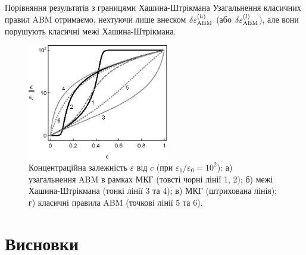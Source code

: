 \documentclass[10pt]{beamer}
\begin{document}
\begin{frame}{Порівняння результатів з границями Хашина-Штрікмана}
\footnotesize
Узагальнення класичних правил ABM отримаємо, нехтуючи лише внеском $\delta\varepsilon_{\rm ABM}^{(h)}$ (або $\delta\varepsilon_{\rm ABM}^{(l)}$), але вони порушують класичні межі Хашина-Штрікмана. 
\begin{figure}[tb]
    \centering
    \includegraphics[width=0.55\textwidth]{images/hanai-fig2.eps}
    \caption{\label{fig:HSbounds}
    Концентраційна залежність $\varepsilon$ від $c$ (при $\varepsilon_1/\varepsilon_0 = 10^2$): а) узагальнення ABM в рамках МКГ (товсті чорні лінії 1, 2); б) межі Хашина-Штрікмана (тонкі лінії 3 та 4); в) МКГ (штрихована лінія); г) класичні правила ABM (точкові лінії 5 та 6).}
\end{figure}

\end{frame}


\section{Висновки}%
\end{document}
